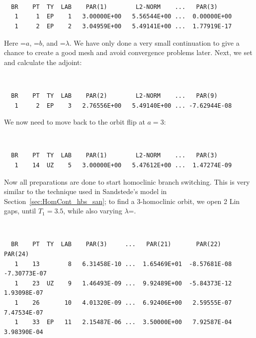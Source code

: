 \documentclass[12pt]{report}
\begin{document}
\begin{center}
\\
\\
\\
\end{center}
\begin{verbatim}
  BR    PT  TY  LAB    PAR(1)        L2-NORM    ...   PAR(3)     
   1     1  EP    1   3.00000E+00   5.56544E+00 ...  0.00000E+00
   1     2  EP    2   3.04959E+00   5.49141E+00 ...  1.77919E-17
\end{verbatim}
Here =$a$, =$b$, and
=$\lambda$. We have only done a
very small continuation to give \AUTO a chance to create a good mesh
and avoid convergence problems later.
Next, we set  and calculate the adjoint:
\begin{center}
\\
\end{center}
\begin{verbatim}
  BR    PT  TY  LAB    PAR(2)        L2-NORM    ...   PAR(9)
   1     2  EP    3   2.76556E+00   5.49140E+00 ... -7.62944E-08
\end{verbatim}
We now need to move back to the orbit flip at $a=3$:
\begin{center}
\\
\end{center}
\begin{verbatim}
  BR    PT  TY  LAB    PAR(1)        L2-NORM    ...   PAR(3)     
   1    14  UZ    5   3.00000E+00   5.47612E+00 ...  1.47274E-09
\end{verbatim}
Now all preparations are done to start homoclinic branch
switching. This is very similar to the technique used in 
Sandstede's model in Section~\ref{sec:HomCont_hbs_san}; 
to find a 3-homoclinic orbit, we open 2 Lin gaps,
until $T_1=3.5$, while also varying $\lambda$=.
\begin{center}
\\
\end{center}
\begin{verbatim}
  BR    PT  TY  LAB    PAR(3)     ...   PAR(21)       PAR(22)       PAR(24)
   1    13        8   6.31458E-10 ...  1.65469E+01  -8.57681E-08  -7.30773E-07
   1    23  UZ    9   1.46493E-09 ...  9.92489E+00  -5.84373E-12   1.93098E-07
   1    26       10   4.01320E-09 ...  6.92406E+00   2.59555E-07   7.47534E-07
   1    33  EP   11   2.15487E-06 ...  3.50000E+00   7.92587E-04   3.98390E-04
\end{verbatim}
\end{document}
